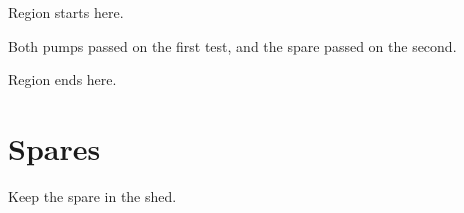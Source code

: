 \documentclass[11pt]{article}
\begin{document}
Region starts here.

Both pumps passed  on the first test, and the spare passed on the second.

Region ends here.

\section{Spares}
Keep the spare in the shed.
\end{document}
